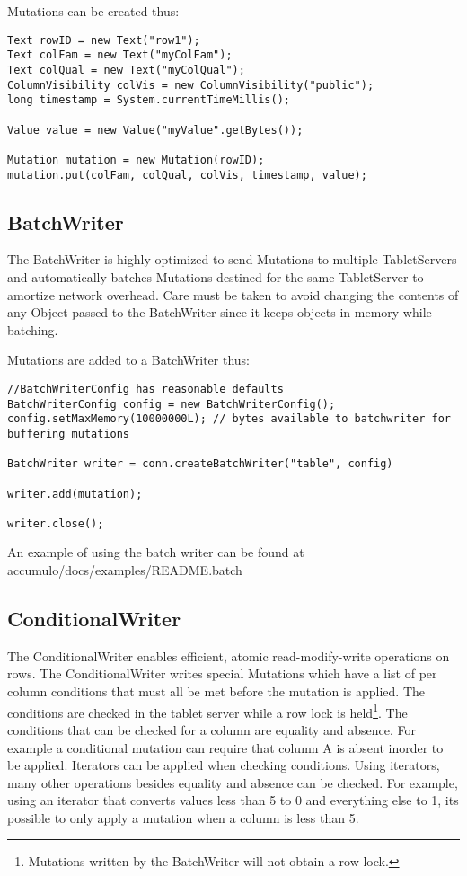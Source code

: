Mutations can be created thus:

\begingroup\fontsize{8pt}{8pt}\selectfont\begin{verbatim}
Text rowID = new Text("row1");
Text colFam = new Text("myColFam");
Text colQual = new Text("myColQual");
ColumnVisibility colVis = new ColumnVisibility("public");
long timestamp = System.currentTimeMillis();

Value value = new Value("myValue".getBytes());

Mutation mutation = new Mutation(rowID);
mutation.put(colFam, colQual, colVis, timestamp, value);
\end{verbatim}\endgroup

\subsection{BatchWriter}
The BatchWriter is highly optimized to send Mutations to multiple TabletServers
and automatically batches Mutations destined for the same TabletServer to
amortize network overhead. Care must be taken to avoid changing the contents of
any Object passed to the BatchWriter since it keeps objects in memory while
batching.

Mutations are added to a BatchWriter thus:

\begingroup\fontsize{8pt}{8pt}\selectfont\begin{verbatim}
//BatchWriterConfig has reasonable defaults
BatchWriterConfig config = new BatchWriterConfig();
config.setMaxMemory(10000000L); // bytes available to batchwriter for buffering mutations

BatchWriter writer = conn.createBatchWriter("table", config)

writer.add(mutation);

writer.close();
\end{verbatim}\endgroup

An example of using the batch writer can be found at\\
accumulo/docs/examples/README.batch

\subsection{ConditionalWriter} 
The ConditionalWriter enables efficient, atomic read-modify-write operations on
rows.  The ConditionalWriter writes special Mutations which have a list of per
column conditions that must all be met before the mutation is applied.  The
conditions are checked in the tablet server while a row lock is
held\footnote{Mutations written by the BatchWriter will not obtain a row
lock.}.  The conditions that can be checked for a column are equality and
absence.  For example a conditional mutation can require that column A is
absent inorder to be applied.  Iterators can be applied when checking
conditions.  Using iterators, many other operations besides equality and
absence can be checked.  For example, using an iterator that converts values
less than 5 to 0 and everything else to 1, its possible to only apply a
mutation when a column is less than 5.

